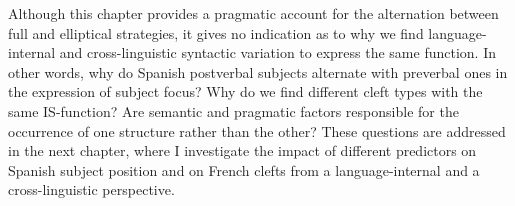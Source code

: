 Although this chapter provides a pragmatic account for the alternation between full and elliptical strategies, it gives no indication as to why we find language-internal and cross-linguistic syntactic variation to express the same function. In other words, why do Spanish postverbal subjects alternate with preverbal ones in the expression of subject focus? Why do we find different cleft types with the same IS-function? Are semantic and pragmatic factors responsible for the occurrence of one structure rather than the other? These questions are addressed in the next chapter, where I investigate the impact of different predictors on Spanish subject position and on French clefts from a language-internal and a cross-linguistic perspective.
